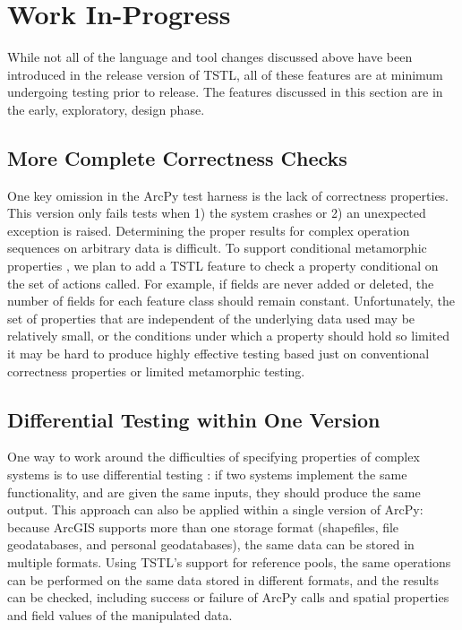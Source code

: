 \section{Work In-Progress}
\label{future}

While not all of the language and tool changes discussed above have
been introduced in the release version of TSTL, all of these features are at
minimum undergoing testing prior to release.  The features discussed
in this section are in the early, exploratory, design phase.

\subsection{More Complete Correctness Checks}
\label{futureoracle}

One key omission in the ArcPy test harness is the lack of correctness
properties.  This version only fails tests when 1) the system crashes
or 2) an unexpected exception is raised.  Determining the proper
results for complex operation sequences on arbitrary data is
difficult.  To support conditional metamorphic properties \cite{MetaTest}, we plan to
add a TSTL feature to check a property conditional on the set of
actions called.  For example, if fields are never added or deleted, the number of
fields for each feature class should remain constant.  Unfortunately,
the set of properties that are independent of the underlying data used
may be relatively small, or the conditions under which a property
should hold so limited it may be hard to produce highly effective
testing based just on conventional correctness properties or limited
metamorphic testing.

\subsection{Differential Testing within One Version}
\label{sec:reftest}

One way to work around the difficulties of specifying properties of
complex systems is to use differential testing \cite{Differential,ICSEDiff}:  if two systems
implement the same functionality, and are given the same inputs, they
should produce the same output.  This approach can also be applied
within a single version of ArcPy:  because ArcGIS supports more than
one storage format (shapefiles, file geodatabases, and personal
geodatabases), the same data can be stored in multiple formats.  Using
TSTL's support for reference pools, the same operations can be
performed on the same data stored in different formats, and the
results can be checked, including success or failure of ArcPy calls
and spatial properties and field values of the manipulated data.

